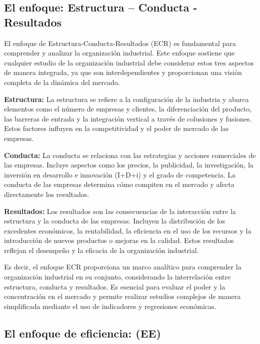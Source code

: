 \documentclass[
  letterpaper,
  DIV=11,
  numbers=noendperiod]{scrartcl}
\begin{document}
\hypertarget{el-enfoque-estructura-conducta---resultados}{%
\subsection{El enfoque: Estructura -- Conducta -
Resultados}\label{el-enfoque-estructura-conducta---resultados}}

El enfoque de Estructura-Conducta-Resultados (ECR) es fundamental para
comprender y analizar la organización industrial. Este enfoque sostiene
que cualquier estudio de la organización industrial debe considerar
estos tres aspectos de manera integrada, ya que son interdependientes y
proporcionan una visión completa de la dinámica del mercado.

\textbf{Estructura:} La estructura se refiere a la configuración de la
industria y abarca elementos como el número de empresas y clientes, la
diferenciación del producto, las barreras de entrada y la integración
vertical a través de colusiones y fusiones. Estos factores influyen en
la competitividad y el poder de mercado de las empresas.

\textbf{Conducta:} La conducta se relaciona con las estrategias y
acciones comerciales de las empresas. Incluye aspectos como los precios,
la publicidad, la investigación, la inversión en desarrollo e innovación
(I+D+i) y el grado de competencia. La conducta de las empresas determina
cómo compiten en el mercado y afecta directamente los resultados.

\textbf{Resultados:} Los resultados son las consecuencias de la
interacción entre la estructura y la conducta de las empresas. Incluyen
la distribución de los excedentes económicos, la rentabilidad, la
eficiencia en el uso de los recursos y la introducción de nuevos
productos o mejoras en la calidad. Estos resultados reflejan el
desempeño y la eficacia de la organización industrial.

Es decir, el enfoque ECR proporciona un marco analítico para comprender
la organización industrial en su conjunto, considerando la interrelación
entre estructura, conducta y resultados. Es esencial para evaluar el
poder y la concentración en el mercado y permite realizar estudios
complejos de manera simplificada mediante el uso de indicadores y
regresiones económicas.

\hypertarget{el-enfoque-de-eficiencia-ee}{%
\subsection{El enfoque de eficiencia:
(EE)}\label{el-enfoque-de-eficiencia-ee}}
\end{document}
